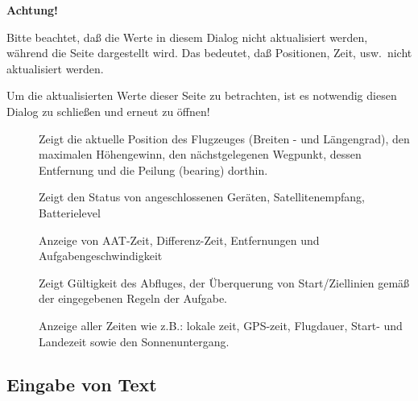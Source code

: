 \textbf{Achtung!}

Bitte beachtet, daß die Werte in diesem Dialog nicht aktualisiert werden, während die Seite dargestellt wird.
Das bedeutet, daß Positionen, Zeit, usw.\ nicht aktualisiert werden. 

Um die aktualisierten Werte dieser Seite zu betrachten, ist es notwendig diesen Dialog zu schließen und erneut zu öffnen!  

\begin{description}
\item[]Zeigt die aktuelle Position des Flugzeuges (Breiten - und Längengrad), den maximalen Höhengewinn, den nächstgelegenen Wegpunkt, dessen Entfernung  und die Peilung (bearing) dorthin.

\item[] Zeigt den Status von angeschlossenen Geräten, Satellitenempfang,  Batterielevel

\item[] Anzeige von AAT-Zeit, Differenz-Zeit, Entfernungen und Aufgabengeschwindigkeit

\item[] Zeigt Gültigkeit des Abfluges, der Überquerung von Start/Ziellinien gemäß der eingegebenen Regeln der Aufgabe.

\item[] Anzeige aller Zeiten wie z.B.: lokale zeit, GPS-zeit, Flugdauer, Start-  und Landezeit sowie den Sonnenuntergang.
\end{description}

\subsection*{Eingabe von Text} \label{sec:textentry}

